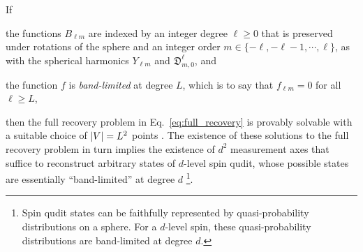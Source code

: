 \documentclass[notitlepage,twocolumn]{revtex4-2}
\renewcommand{\set}[1]{\{#1\}} %
\newcommand{\1}{\mathds{1}}
\newcommand{\D}{\mathfrak{D}}
\begin{document}
If
\begin{enumerate*}
\item the functions $B_{\ell m}$ are indexed by an integer degree $\ell\ge0$ that is preserved under rotations of the sphere and an integer order $m\in\set{-\ell,-\ell-1,\cdots,\ell}$, as with the spherical harmonics $Y_{\ell m}$ and $\D^\ell_{m,0}$, and
\item the function $f$ is {\it band-limited} at degree $L$, which is to say that $f_{\ell m}=0$ for all $\ell\ge L$,
\end{enumerate*}
then the full recovery problem in Eq.~\eqref{eq:full_recovery} is provably solvable with a suitable choice of $\abs{V}=L^2$ points \cite{freeden2008spherical, freeden2018spherical}.
The existence of these solutions to the full recovery problem in turn implies the existence of $d^2$ measurement axes that suffice to reconstruct arbitrary states of $d$-level spin qudit, whose possible states are essentially ``band-limited'' at degree $d$ \footnote{Spin qudit states can be faithfully represented by quasi-probability distributions on a sphere.  For a $d$-level spin, these quasi-probability distributions are band-limited at degree $d$.}.
\end{document}
